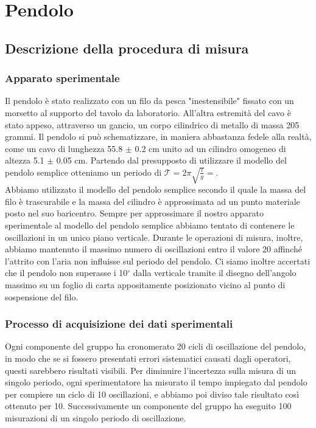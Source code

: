\documentclass[12pt, twoside, a4paper]{article}
\begin{document}
\newpage

\section{Pendolo}
	\subsection{Descrizione della procedura di misura}
		\subsubsection{Apparato sperimentale}
Il pendolo è stato realizzato con un filo da pesca "inestensibile" fissato con un morsetto al supporto del tavolo da laboratorio. All'altra estremità del cavo è stato appeso, attraverso un gancio, un corpo cilindrico di metallo di massa 205 grammi. Il pendolo si può schematizzare, in maniera abbastanza fedele alla realtà, come un cavo di lunghezza 55.8 $\pm$ 0.2 cm unito ad un cilindro omogeneo di altezza 5.1 $\pm$ 0.05 cm. Partendo dal presupposto di utilizzare il modello del pendolo semplice otteniamo un periodo di $\mathcal{T} = 2\pi \sqrt{\frac{l}{g}}= $.\\
Abbiamo utilizzato il modello del pendolo semplice secondo il quale la massa del filo è trascurabile e la massa del cilindro è approssimata ad un punto materiale posto nel suo baricentro. Sempre per approssimare il nostro apparato sperimentale al modello del pendolo semplice abbiamo tentato di contenere le oscillazioni in un unico piano verticale. Durante le operazioni di misura, inoltre, abbiamo mantenuto il massimo numero di oscillazioni entro il valore 20 affinché l'attrito con l'aria non influisse sul periodo del pendolo. Ci siamo inoltre accertati che il pendolo non superasse i 10$^\circ$ dalla verticale tramite il disegno dell'angolo massimo su un foglio di carta appositamente posizionato vicino al punto di sospensione del filo.
		\subsubsection{Processo di acquisizione dei dati sperimentali}
Ogni componente del gruppo ha cronomerato 20 cicli di oscillazione del pendolo, in modo che se si fossero presentati errori sistematici causati dagli operatori, questi sarebbero risultati visibili. Per diminuire l'incertezza sulla misura di un singolo periodo, ogni sperimentatore ha misurato il tempo impiegato dal pendolo per compiere un ciclo di 10 oscillazioni, e abbiamo poi diviso tale risultato così ottenuto per 10. Successivamente un componente del gruppo ha eseguito 100 misurazioni di un singolo periodo di oscillazione. 
\end{document}
